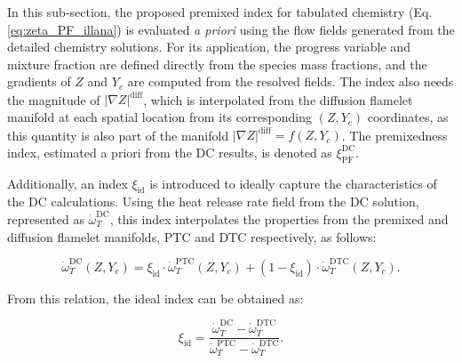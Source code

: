 \documentclass[preprint,12pt,authoryear]{elsarticle}
\begin{document}
{In this sub-section, the proposed premixed index for tabulated 
chemistry (Eq. \ref{eq:zeta_PF_illana}) is evaluated \textsl{a priori} using the flow fields generated from the detailed chemistry solutions. For its application, the progress variable and mixture fraction are defined directly from the species mass fractions, and the gradients of $Z$ and $Y_c$ are computed from the resolved fields. The index also needs the magnitude of $|\nabla Z|^\mathrm{diff}$, which is interpolated  from the diffusion flamelet manifold at each spatial location  from its corresponding $(Z,Y_c)$ coordinates, as this quantity is also part of the manifold  $|\nabla Z|^\mathrm{diff}=f(Z,Y_c)$. The premixedness index, estimated a priori from the DC results, is denoted as $\xi_\mathrm{PF}^\mathrm{DC}$.

Additionally, an index $\xi_\mathrm{id}$ is introduced 
to ideally capture the characteristics of the DC calculations. Using the heat release rate field from the DC solution, represented as $\dot{\omega}_{T}^\mathrm{DC}$, this index interpolates the properties from the premixed and diffusion flamelet manifolds, 
$\mathrm{PTC}$ and $\mathrm{DTC}$ respectively, as follows:



\begin{equation}
\label{eq:omega_T_zeta_id_definition}
    \dot{\omega}_{T}^\mathrm{DC} \left( Z, Y_c \right) = \xi_\mathrm{id} \cdot  \dot{\omega}_{T}^\mathrm{PTC} \left( Z, Y_c \right) + \left( 1 -  \xi_\mathrm{id} \right) \cdot  \dot{\omega}_{T}^\mathrm{DTC} \left( Z, Y_c \right).
\end{equation}

From this relation, the ideal index can be obtained as:

\begin{equation}
\label{eq:zeta_id}
    \xi_\mathrm{id} = \frac{\dot{\omega}_{T}^\mathrm{DC} - \dot{\omega}_{T}^\mathrm{DTC}}{\dot{\omega}_{T}^\mathrm{PTC} - \dot{\omega}_{T}^\mathrm{DTC}}.
\end{equation}


}
\end{document}
